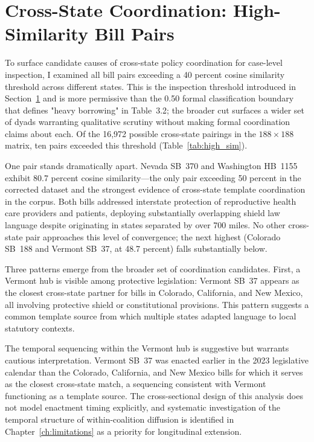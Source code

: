 \section{Cross-State Coordination: High-Similarity Bill Pairs}
\label{sec:coordination}
To surface candidate causes of cross-state policy coordination for case-level inspection, I examined all bill pairs exceeding a 40 percent cosine similarity threshold across different states. This is the inspection threshold introduced in Section~\ref{sec:coordination} and is more permissive than the 0.50 formal classification boundary that defines "heavy borrowing" in Table~3.2; the broader cut surfaces a wider set of dyads warranting qualitative scrutiny without making formal coordination claims about each. Of the 16,972 possible cross-state pairings in the $188 \times 188$ matrix, ten pairs exceeded this threshold (Table~\ref{tab:high_sim}).

One pair stands dramatically apart. Nevada SB~370 and Washington HB~1155 exhibit 80.7 percent cosine similarity---the only pair exceeding 50 percent in the corrected dataset and the strongest evidence of cross-state template coordination in the corpus. Both bills addressed interstate protection of reproductive health care providers and patients, deploying substantially overlapping shield law language despite originating in states separated by over 700 miles. No other cross-state pair approaches this level of convergence; the next highest (Colorado SB~188 and Vermont SB~37, at 48.7 percent) falls substantially below.

Three patterns emerge from the broader set of coordination candidates. First, a Vermont hub is visible among protective legislation: Vermont SB~37 appears as the closest cross-state partner for bills in Colorado, California, and New Mexico, all involving protective shield or constitutional provisions. This pattern suggests a common template source from which multiple states adapted language to local statutory contexts.

The temporal sequencing within the Vermont hub is suggestive but warrants cautious interpretation. Vermont SB~37 was enacted earlier in the 2023 legislative calendar than the Colorado, California, and New Mexico bills for which it serves as the closest cross-state match, a sequencing consistent with Vermont functioning as a template source. The cross-sectional design of this analysis does not model enactment timing explicitly, and systematic investigation of the temporal structure of within-coalition diffusion is identified in Chapter~\ref{ch:limitations} as a priority for longitudinal extension.

